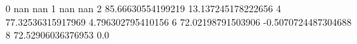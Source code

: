 0 nan nan
1 nan nan
2 85.66630554199219 13.137245178222656
4 77.32536315917969 4.796302795410156
6 72.02198791503906 -0.5070724487304688
8 72.52906036376953 0.0
